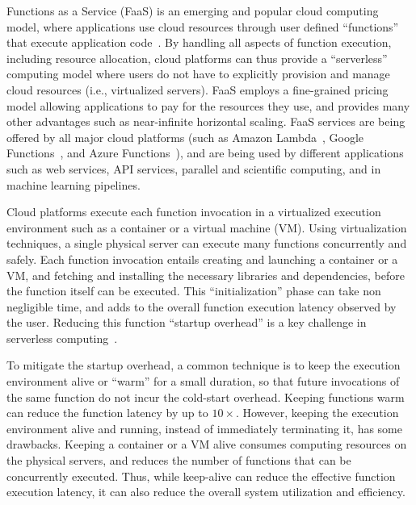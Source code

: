
Functions as a Service (FaaS) is an emerging and popular cloud computing model, where applications use cloud resources through user defined ``functions'' that execute application code~\cite{jonas_cloud_2019}.
%
By handling all aspects of function execution, including resource allocation, cloud platforms can thus provide a ``serverless'' computing model where users do not have to explicitly provision and manage cloud resources (i.e., virtualized servers).
%
FaaS employs a fine-grained pricing model allowing applications to pay for the resources they use, and provides many other advantages such as near-infinite horizontal scaling. 
%
FaaS services are being offered by all major cloud platforms (such as Amazon Lambda~\cite{aws-lambda}, Google Functions~\cite{google-functions}, and Azure Functions~\cite{azure-functions}), and are being used by different applications such as web services, API services,  parallel and scientific computing, and in machine learning pipelines. 


Cloud platforms execute each function invocation in a virtualized execution environment such as a container or a virtual machine (VM). %
%
Using virtualization techniques, a single physical server can execute many functions concurrently and safely. 
%
Each function invocation entails creating and launching a container or a VM, and fetching and installing the necessary libraries and dependencies, before the function itself can be executed.
%
This ``initialization'' phase can take non negligible time, and adds to the overall function execution latency observed by the user. 
%
Reducing this function ``startup overhead'' is a key challenge in serverless computing~\cite{oakes_sock_2018, hendrickson2016serverless, warm1, warm2}. 



To mitigate the startup overhead, a common technique is to keep the execution environment alive or ``warm'' for a small duration, so that future invocations of the same function do not incur the cold-start overhead. 
%
Keeping functions warm can reduce the function latency by up to $10\times$. 
%
However, keeping the execution environment alive and running, instead of immediately terminating it, has some drawbacks. 
%
Keeping a container or a VM alive consumes computing resources on the physical servers, and reduces the  number of functions that can be concurrently executed. 
%
Thus, while keep-alive can reduce the effective function execution latency, it can also reduce the overall system utilization and efficiency. 
%


